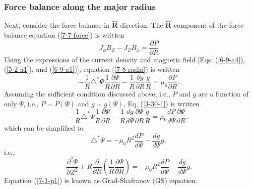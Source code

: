\documentclass{article}
\begin{document}
\subsubsection{Force balance along the major radius}

Next, consider the force balance in $\hat{\mathbf{R}}$ direction. The
$\hat{\mathbf{R}}$ component of the force balance equation (\ref{7-7-force})
is written
\begin{equation}
  \label{7-8-radia} J_{\phi} B_Z - J_Z B_{\phi} = \frac{\partial P}{\partial
  R}
\end{equation}
Using the expressions of the current density and magnetic field [Eqs.
(\ref{6-9-a4}), (\ref{5-2-a1}), and (\ref{6-9-a1})], equation
(\ref{7-8-radia}) is written
\begin{equation}
  \label{3-30-1} - \frac{1}{R} \triangle^{\ast} \Psi \frac{1}{R}
  \frac{\partial \Psi}{\partial R} - \frac{1}{R} \frac{\partial g}{\partial R}
  \frac{g}{R} = \mu_0 \frac{\partial P}{\partial R} .
\end{equation}
Assuming the sufficient condition discussed above, i.e., $P$ and $g$ are a
function of only $\Psi$, i.e., $P = P (\Psi)$ and $g = g (\Psi)$, Eq.
(\ref{3-30-1}) is written
\begin{equation}
  - \frac{1}{R} \triangle^{\ast} \Psi \frac{1}{R} \frac{\partial
  \Psi}{\partial R} - \frac{1}{R} \frac{d g}{d \Psi} \frac{\partial
  \Psi}{\partial R}  \frac{g}{R} = \mu_0 \frac{d P}{d \Psi} \frac{\partial
  \Psi}{\partial R},
\end{equation}
which can be simplified to
\begin{equation}
  \triangle^{\ast} \Psi = - \mu_0 R^2 \frac{d P}{d \Psi} - \frac{d g}{d \Psi}
  g,
\end{equation}
i.e.,
\begin{equation}
  \label{7-1-p1} \frac{\partial^2 \Psi}{\partial Z^2} + R
  \frac{\partial}{\partial R} \left( \frac{1}{R} \frac{\partial \Psi}{\partial
  R} \right) = - \mu_0 R^2 \frac{d P}{d \Psi} - \frac{d g}{d \Psi} g.
\end{equation}
Equation (\ref{7-1-p1}) is known as Grad-Shafranov (GS) equation.
\end{document}
